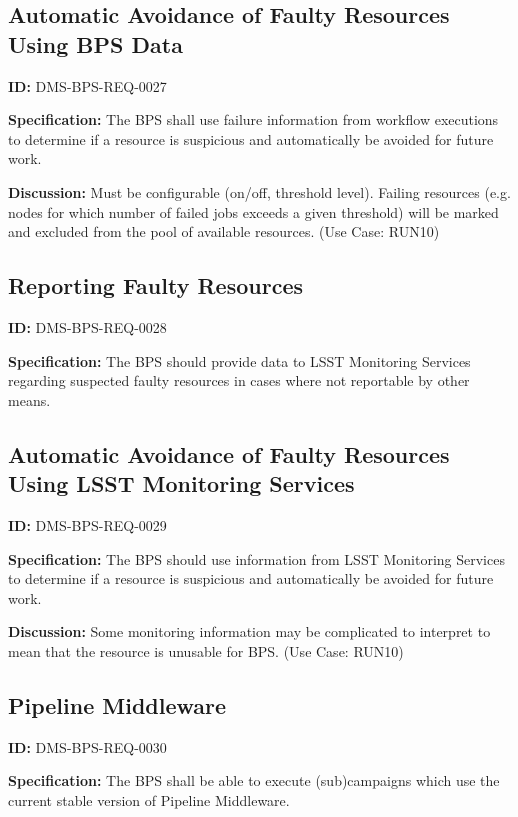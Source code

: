 \documentclass[SE,toc]{lsstdoc}
\begin{document}
\subsection{Automatic Avoidance of Faulty Resources Using BPS Data}

\label{DMS-BPS-REQ-0027}
\textbf{ID:} DMS-BPS-REQ-0027

\textbf{Specification:}
The BPS shall use failure information from workflow executions to determine if a resource is suspicious and automatically be avoided for future work.

\textbf{Discussion:}
Must be configurable (on/off, threshold level).  Failing resources (e.g. nodes for which number of failed jobs exceeds a given threshold) will be marked and excluded from the pool of available resources.  (Use Case: RUN10)

\subsection{Reporting Faulty Resources}

\label{DMS-BPS-REQ-0028}
\textbf{ID:} DMS-BPS-REQ-0028

\textbf{Specification:}
The BPS should provide data to LSST Monitoring Services regarding suspected faulty resources in cases where not reportable by other means.

\subsection{Automatic Avoidance of Faulty Resources Using LSST Monitoring Services}

\label{DMS-BPS-REQ-0029}
\textbf{ID:} DMS-BPS-REQ-0029

\textbf{Specification:}
The BPS should use information from LSST Monitoring Services to determine if a resource is suspicious and automatically be avoided for future work.

\textbf{Discussion:}
Some monitoring information may be complicated to interpret to mean that the resource is unusable for BPS.  (Use Case: RUN10)

\subsection{Pipeline Middleware}

\label{DMS-BPS-REQ-0030}
\textbf{ID:} DMS-BPS-REQ-0030

\textbf{Specification:}
The BPS shall be able to execute (sub)campaigns which use the current stable version of Pipeline Middleware.
\end{document}
